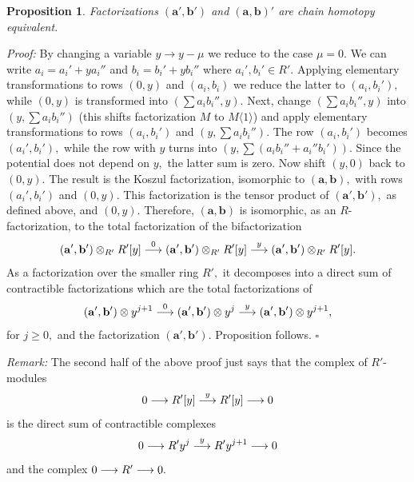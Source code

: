 \documentclass[12pt]{article}
\newtheorem{prop}{Proposition}
\begin{document}
\begin{prop} \label{without-row} Factorizations $(\mathbf{a}',\mathbf{b}')$ and 
$(\mathbf{a},\mathbf{b})'$ are chain homotopy equivalent. 
\end{prop} 

\emph{Proof:} By changing a variable $y\to y-\mu$ we reduce to the case $\mu=0.$ 
We can write  $a_i=a_i'+ y a_i''$ and $b_i=b_i'+y b_i''$ 
where $a_i', b_i'\in R'.$ 
Applying elementary transformations to rows $(0,y)$ and $(a_i,b_i)$ 
we reduce the latter to $(a_i,b_i'),$ while $(0,y)$ is transformed into 
$(\sum a_i b_i'', y).$ Next, 
change $(\sum a_i b_i'',y)$ into $(y,\sum a_i b_i'')$ (this shifts factorization 
 $M$ to $M\langle 1 \rangle$) and  
apply elementary transformations to rows $(a_i,b_i')$ and $(y,\sum a_i b_i'').$ 
The row $(a_i, b_i')$ becomes $(a_i', b_i'),$ while the row with $y$ turns
into $(y, \sum (a_i b_i'' + a_i'' b_i')).$ Since the potential does not depend on $y,$ 
the latter sum is zero. Now shift $(y,0)$ back to $(0,y).$ The result is the Koszul factorization, 
isomorphic to 
$(\mathbf{a},\mathbf{b}),$ with rows $(a_i',b_i')$ and $(0,y).$ 
This factorization 
is the tensor product of $(\mathbf{a}',\mathbf{b}'),$ as defined above, and 
$(0,y).$ Therefore, $(\mathbf{a},\mathbf{b})$ is isomorphic, as 
an $R$-factorization, to the total factorization of the bifactorization 
 $$ (\mathbf{a}',\mathbf{b}')\otimes_{R'}R'[y] \stackrel{0}{\longrightarrow}
 (\mathbf{a}',\mathbf{b}')\otimes_{R'}R'[y] \stackrel{y}{\longrightarrow} 
 (\mathbf{a}',\mathbf{b}')\otimes_{R'}R'[y]. $$ 
As a factorization over the smaller ring $R',$ it decomposes into a direct sum of 
 contractible factorizations which are the total factorizations of  
 $$  (\mathbf{a}',\mathbf{b}')\otimes  y^{j+1}  \stackrel{0}{\longrightarrow}
   (\mathbf{a}',\mathbf{b}')\otimes  y^{j}  \stackrel{y}{\longrightarrow} 
 (\mathbf{a}',\mathbf{b}')\otimes  y^{j+1}, $$
for $j\ge 0,$ and the factorization $ (\mathbf{a}',\mathbf{b}').$ Proposition 
follows. $\square$
 
\emph{Remark:} The second half of the above proof just says that the 
complex of $R'$-modules 
$$0\longrightarrow R'[y] \stackrel{y}{\longrightarrow} R'[y] \longrightarrow 0$$ 
is the direct sum of contractible complexes 
$$ 0\longrightarrow R' y^j \stackrel{y}{\longrightarrow} R' y^{j+1} \longrightarrow 0$$ 
and the complex $0 \longrightarrow R' \longrightarrow 0.$ 

\vspace{0.1in} 
\end{document}
